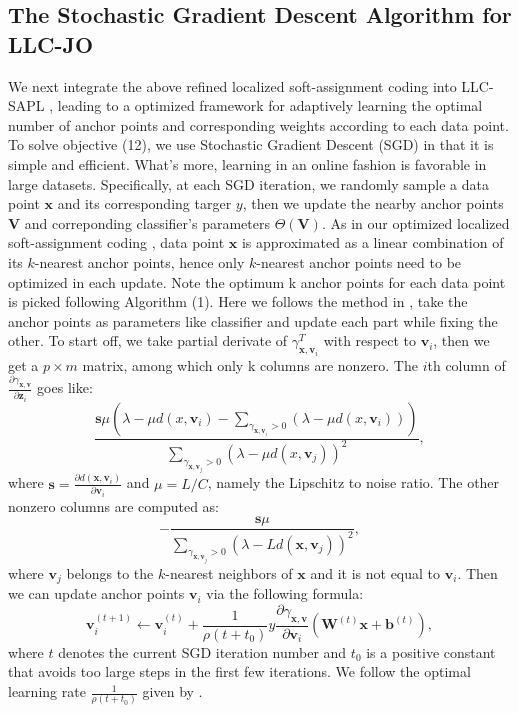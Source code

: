 \documentclass{llncs}
\def \x {\mathbf{x}}
\def \W {\mathbf{W}}
\def \v {\mathbf{v}}
\def \V {\mathbf{V}}
\def \z {\mathbf{z}}
\def \b {\mathbf{b}}
\def \s {\mathbf{s}}
\begin{document}
	\subsection{The Stochastic Gradient Descent Algorithm for LLC-JO}
	We next integrate the above refined localized soft-assignment coding  into LLC-SAPL \cite{4}, leading to a optimized framework for adaptively learning the optimal number of anchor points and corresponding weights according to each data point. To solve objective (12), we use Stochastic Gradient Descent (SGD) in that it is simple and efficient. What's more, learning in an online fashion is favorable in large datasets. Specifically, at each SGD iteration, we randomly sample a data point $\x$ and its corresponding targer $y$, then we update the nearby anchor points $\V$ and correponding classifier's parameters $\Theta(\V)$. As in our optimized localized soft-assignment coding , data point $\x$ is approximated as a linear combination of its $k$-nearest anchor points, hence only $k$-nearest anchor points need to be optimized in each update. Note the optimum k anchor points for each data point is picked following Algorithm (1). Here we follows the method in \cite{4}, take the anchor points as parameters like classifier and update each part while fixing the other. To start off, we take partial derivate of $\gamma_{\x,\v_i}^T$ with respect to $\v_i$, then we get a $p\times m$ matrix, among which only k columns are nonzero. The $i$th column of $\frac{\partial\gamma_{\x,\v}}{\partial\z_i}$ goes like:
	\begin{equation}
	\frac{\s\mu(\lambda-\mu d(x,\v_i)-\sum_{\gamma_{\x,\v_i}>0}(\lambda-\mu d(x,\v_i)))}{\sum_{\gamma_{\x,\v_j}>0}(\lambda-\mu d(x,\v_j))^2},
	\end{equation}
	where $\s = \frac{\partial d(\x,\v_i)}{\partial \v_i}$ and $\mu = L/C$, namely the Lipschitz to noise ratio. The other nonzero columns are computed as:
	\begin{equation}
	-\frac{\s\mu}{\sum_{\gamma_{\x,\v_j}>0}(\lambda-Ld(\x,\v_j))^2},
	\end{equation}
	where $\v_j$ belongs to the $k$-nearest neighbors of $\x$ and it is not equal to $\v_i$. Then we can update anchor points $\v_i$ via the following formula:
	\begin{equation}
	\v_i^{(t+1)} \leftarrow \v_i^{(t)} + \frac{1}{\rho(t+t_0)}y\frac{\partial \gamma_{\x,\v}}{\partial \v_i}(\W^{(t)}\x + \b^{(t)}),
	\end{equation}
	where $t$ denotes the current SGD iteration number and $t_0$ is a positive constant that avoids too large steps in the first few iterations. We follow the optimal learning rate  $\frac{1}{\rho(t+t_0)}$ given by \cite{13} \cite{14}.
\end{document}
